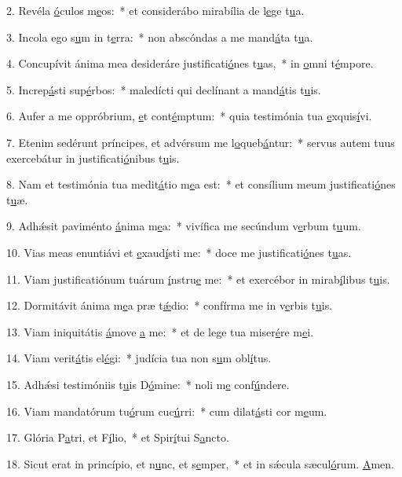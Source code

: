 2. Revéla \uline{ó}culos m\uline{e}os:~* et considerábo mirabília de l\uline{e}ge t\uline{u}a.\par 
3. Incola ego s\uline{u}m in t\uline{e}rra:~* non abscóndas a me mand\uline{á}ta t\uline{u}a.\par 
4. Concupívit ánima mea desideráre justificati\uline{ó}nes t\uline{u}as,~* in \uline{o}mni t\uline{é}mpore.\par 
5. Increp\uline{á}sti sup\uline{é}rbos:~* maledícti qui declínant a mand\uline{á}tis t\uline{u}is.\par 
6. Aufer a me oppróbrium, \uline{e}t cont\uline{é}mptum:~* quia testimónia tua \uline{e}xquis\uline{í}vi.\par 
7. Etenim sedérunt príncipes, et advérsum me l\uline{o}queb\uline{á}ntur:~* servus autem tuus exercebátur in justificati\uline{ó}nibus t\uline{u}is.\par 
8. Nam et testimónia tua medit\uline{á}tio m\uline{e}a est:~* et consílium meum justificati\uline{ó}nes t\uline{u}æ.\par 
9. Adhǽsit paviménto \uline{á}nima m\uline{e}a:~* vivífica me secúndum v\uline{e}rbum t\uline{u}um.\par 
10. Vias meas enuntiávi et \uline{e}xaud\uline{í}sti me:~* doce me justificati\uline{ó}nes t\uline{u}as.\par 
11. Viam justificatiónum tuárum \uline{í}nstru\uline{e} me:~* et exercébor in mirab\uline{í}libus t\uline{u}is.\par 
12. Dormitávit ánima m\uline{e}a præ t\uline{ǽ}dio:~* confírma me in v\uline{e}rbis t\uline{u}is.\par 
13. Viam iniquitátis \uline{á}move \uline{a} me:~* et de lege tua miser\uline{é}re m\uline{e}i.\par 
14. Viam verit\uline{á}tis el\uline{é}gi:~* judícia tua non s\uline{u}m obl\uline{í}tus.\par 
15. Adhǽsi testimóniis t\uline{u}is D\uline{ó}mine:~* noli m\uline{e} conf\uline{ú}ndere.\par 
16. Viam mandatórum tu\uline{ó}rum cuc\uline{ú}rri:~* cum dilat\uline{á}sti cor m\uline{e}um.\par 
17. Glória P\uline{a}tri, et F\uline{í}lio,~* et Spir\uline{í}tui S\uline{a}ncto.\par 
18. Sicut erat in princípio, et n\uline{u}nc, et s\uline{e}mper,~* et in sǽcula sæcul\uline{ó}rum. \uline{A}men.\par 

